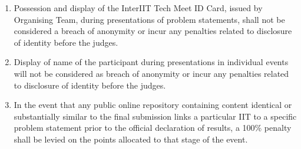 \begin{enumerate}
    \item Possession and display of the InterIIT Tech Meet ID Card, issued by Organising Team, during presentations of problem statements, shall not be considered a breach of anonymity or incur any penalties related to disclosure of identity before the judges. 
    \item Display of name of the participant during presentations in individual events will not be considered as breach of anonymity or incur any penalties related to disclosure of identity before the judges.
    \item In the event that any public online repository containing content identical or substantially similar to the final submission links a particular IIT to a specific problem statement prior to the official declaration of results, a 100\% penalty shall be levied on the points allocated to that stage of the event.
\end{enumerate}
